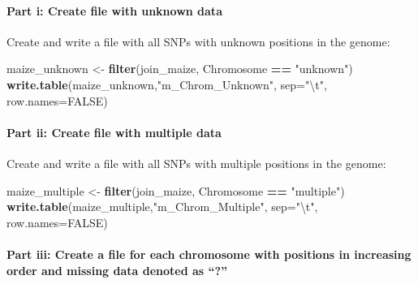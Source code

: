 \documentclass[]{article}
\newenvironment{Shaded}{\begin{snugshade}}{\end{snugshade}}
\newcommand{\CharTok}[1]{\textcolor[rgb]{0.31,0.60,0.02}{#1}}
\newcommand{\DataTypeTok}[1]{\textcolor[rgb]{0.13,0.29,0.53}{#1}}
\newcommand{\KeywordTok}[1]{\textcolor[rgb]{0.13,0.29,0.53}{\textbf{#1}}}
\newcommand{\NormalTok}[1]{#1}
\newcommand{\OperatorTok}[1]{\textcolor[rgb]{0.81,0.36,0.00}{\textbf{#1}}}
\newcommand{\OtherTok}[1]{\textcolor[rgb]{0.56,0.35,0.01}{#1}}
\newcommand{\StringTok}[1]{\textcolor[rgb]{0.31,0.60,0.02}{#1}}
\let\oldparagraph\paragraph
\renewcommand{\paragraph}[1]{\oldparagraph{#1}\mbox{}}
\begin{document}
\hypertarget{part-i-create-file-with-unknown-data}{%
\paragraph{Part i: Create file with unknown
data}\label{part-i-create-file-with-unknown-data}}

Create and write a file with all SNPs with unknown positions in the
genome:

\begin{Shaded}
\begin{Highlighting}[]
\NormalTok{maize_unknown <-}\StringTok{ }\KeywordTok{filter}\NormalTok{(join_maize, Chromosome }\OperatorTok{==}\StringTok{ "unknown"}\NormalTok{)}
\KeywordTok{write.table}\NormalTok{(maize_unknown,}\StringTok{"m_Chrom_Unknown"}\NormalTok{, }\DataTypeTok{sep=}\StringTok{"}\CharTok{\textbackslash{}t}\StringTok{"}\NormalTok{, }\DataTypeTok{row.names=}\OtherTok{FALSE}\NormalTok{)}
\end{Highlighting}
\end{Shaded}

\hypertarget{part-ii-create-file-with-multiple-data}{%
\paragraph{Part ii: Create file with multiple
data}\label{part-ii-create-file-with-multiple-data}}

Create and write a file with all SNPs with multiple positions in the
genome:

\begin{Shaded}
\begin{Highlighting}[]
\NormalTok{maize_multiple <-}\StringTok{ }\KeywordTok{filter}\NormalTok{(join_maize, Chromosome }\OperatorTok{==}\StringTok{ "multiple"}\NormalTok{)}
\KeywordTok{write.table}\NormalTok{(maize_multiple,}\StringTok{"m_Chrom_Multiple"}\NormalTok{, }\DataTypeTok{sep=}\StringTok{"}\CharTok{\textbackslash{}t}\StringTok{"}\NormalTok{, }\DataTypeTok{row.names=}\OtherTok{FALSE}\NormalTok{)}
\end{Highlighting}
\end{Shaded}

\hypertarget{part-iii-create-a-file-for-each-chromosome-with-positions-in-increasing-order-and-missing-data-denoted-as}{%
\paragraph{Part iii: Create a file for each chromosome with positions in
increasing order and missing data denoted as
``?''}\label{part-iii-create-a-file-for-each-chromosome-with-positions-in-increasing-order-and-missing-data-denoted-as}}
\end{document}
